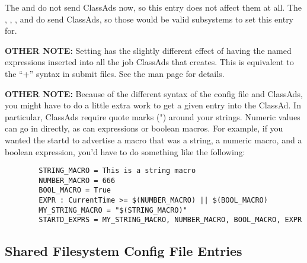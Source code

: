 \begin{description}
  \Note The  and  do not send
  ClassAds now, so this entry does not affect them at all.  The
  , , , and
   do send ClassAds, so those would be valid
  subsystems to set this entry for.
  
  \textbf{OTHER NOTE:} Setting  has the slightly
  different effect of having the named expressions inserted into all
  the job ClassAds that  creates.  This is equivalent
  to the ``+'' syntax in submit files.  See the
   man page for details.  

  \textbf{OTHER NOTE:} Because of the different syntax of the config
  file and ClassAds, you might have to do a little extra work to get a
  given entry into the ClassAd.  In particular, ClassAds require quote
  marks (") around your strings.  Numeric values can go in directly,
  as can expressions or boolean macros.  For example, if you wanted
  the startd to advertise a macro that was a string, a numeric macro,
  and a boolean expression, you'd have to do something like the
  following:

\begin{verbatim}
        STRING_MACRO = This is a string macro
        NUMBER_MACRO = 666
        BOOL_MACRO = True
        EXPR : CurrentTime >= $(NUMBER_MACRO) || $(BOOL_MACRO)
        MY_STRING_MACRO = "$(STRING_MACRO)"
        STARTD_EXPRS = MY_STRING_MACRO, NUMBER_MACRO, BOOL_MACRO, EXPR
\end{verbatim}

\end{description}

\subsection{\label{sec:Shared-Filesystem-Config-File-Entries}
Shared Filesystem Config File Entries}

